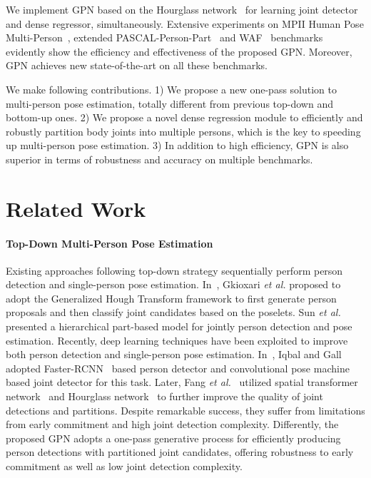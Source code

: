 \documentclass[10pt,twocolumn,letterpaper]{article}
\begin{document}
We implement GPN based on the Hourglass network~\cite{hpe:hourglass_arxiv15} for learning joint detector and dense regressor, simultaneously. Extensive experiments on MPII Human Pose Multi-Person~\cite{andriluka14cvpr}, extended PASCAL-Person-Part~\cite{xia2017joint} and WAF~\cite{eichner2010we} benchmarks evidently show the efficiency and effectiveness of the proposed GPN. Moreover, GPN achieves new state-of-the-art on all these benchmarks.

We make following contributions.
1) We propose a new one-pass solution to multi-person pose estimation, totally different from previous top-down and bottom-up ones.
2) We propose a novel dense regression module to efficiently and robustly partition body joints into multiple persons, which is the key to speeding up multi-person pose estimation.
3) In addition to high efficiency,  GPN is also superior in terms of robustness and accuracy on multiple benchmarks.


\section{Related Work}

\vspace{-2mm}
\paragraph{Top-Down Multi-Person Pose Estimation}
Existing approaches following top-down strategy sequentially perform person detection and
single-person pose estimation. In~\cite{gkioxari2014using}, Gkioxari \emph{et al.} proposed to adopt the Generalized Hough Transform framework to first generate person proposals and then classify joint candidates based on the poselets. Sun \emph{et al.}~\cite{sun2011articulated} presented a hierarchical part-based model for jointly person detection and pose estimation. Recently, deep learning
techniques have been exploited to improve both person detection and single-person pose estimation. In~\cite{iqbal2016multi}, Iqbal and Gall adopted Faster-RCNN~\cite{ren2015faster} based person detector
and convolutional pose machine~\cite{hpe:conv_pose_machine_arxiv16} based joint detector for this task. Later, Fang \emph{et al.}~\cite{fang16rmpe} utilized spatial transformer network~\cite{jaderberg2015spatial}
and Hourglass network~\cite{hpe:hourglass_arxiv15} to further improve the quality of joint detections and partitions. Despite remarkable success, they suffer from limitations
from early commitment and  high joint detection complexity. Differently, the proposed GPN adopts a one-pass generative process for efficiently producing person detections with partitioned joint candidates, offering robustness to  early commitment as well as low joint detection complexity.
\end{document}
